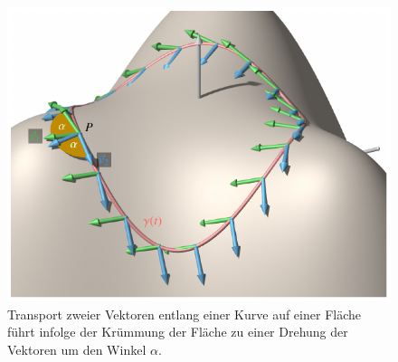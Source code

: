 %
%
%
\begin{figure}
\centering
\includegraphics{chapters/100-zusammenhang/images/transport.pdf}
\caption{Transport zweier Vektoren entlang einer Kurve auf einer Fläche
führt infolge der Krümmung der Fläche zu einer Drehung der Vektoren
um den Winkel $\alpha$.
\label{buch:zusammenhang:fig:transport}}
\end{figure}
